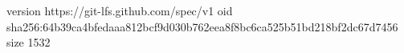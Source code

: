 version https://git-lfs.github.com/spec/v1
oid sha256:64b39ca4bfedaaa812bcf9d030b762eea8f8bc6ca525b51bd218bf2dc67d7456
size 1532
